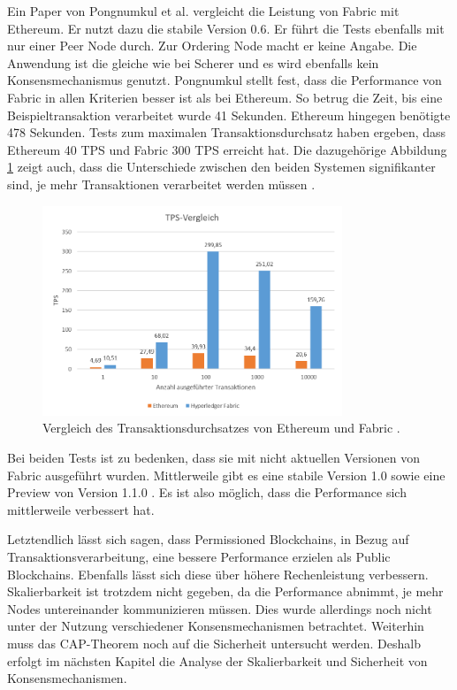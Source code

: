 Ein Paper von Pongnumkul et al. vergleicht die Leistung von Fabric mit Ethereum. Er nutzt dazu die stabile Version 0.6. Er führt die Tests ebenfalls mit nur einer Peer Node durch. Zur Ordering Node macht er keine Angabe. Die Anwendung ist die gleiche wie bei Scherer und es wird ebenfalls kein Konsensmechanismus genutzt. Pongnumkul stellt fest, dass die Performance von Fabric in allen Kriterien besser ist als bei Ethereum. So betrug die Zeit, bis eine Beispieltransaktion verarbeitet wurde 41 Sekunden. Ethereum hingegen benötigte 478 Sekunden. Tests zum maximalen Transaktionsdurchsatz haben ergeben, dass Ethereum 40 \acs{TPS} und Fabric 300 \acs{TPS} erreicht hat. Die dazugehörige Abbildung \ref{fig:tps-ethereum-vs-hyperledger} zeigt auch, dass die Unterschiede zwischen den beiden Systemen signifikanter sind, je mehr Transaktionen verarbeitet werden müssen \cite{PongnumkulPerformanceAnalysisPrivate2017}.

\begin{figure}[!htbp]
  \centering
    \includegraphics[width=0.8\textwidth,angle=0]{images/TPS-ethvshyp}
     \caption{Vergleich des Transaktionsdurchsatzes von Ethereum und Fabric \cite{PongnumkulPerformanceAnalysisPrivate2017}.}
    \label{fig:tps-ethereum-vs-hyperledger}
\end{figure} 

Bei beiden Tests ist zu bedenken, dass sie mit nicht aktuellen Versionen von Fabric ausgeführt wurden. Mittlerweile gibt es eine stabile Version 1.0 sowie eine Preview von Version 1.1.0 \cite{HyperledgerFabricTeamHyperledgerFabricReleases2018}. Es ist also möglich, dass die Performance sich mittlerweile verbessert hat.

Letztendlich lässt sich sagen, dass Permissioned Blockchains, in Bezug auf Transaktionsverarbeitung, eine bessere Performance erzielen als Public Blockchains. Ebenfalls lässt sich diese über höhere Rechenleistung verbessern. Skalierbarkeit ist trotzdem nicht gegeben, da die Performance abnimmt, je mehr Nodes untereinander kommunizieren müssen. Dies wurde allerdings noch nicht unter der Nutzung verschiedener Konsensmechanismen betrachtet. Weiterhin muss das CAP-Theorem noch auf die Sicherheit untersucht werden. Deshalb erfolgt im nächsten Kapitel die Analyse der Skalierbarkeit und Sicherheit von Konsensmechanismen.


